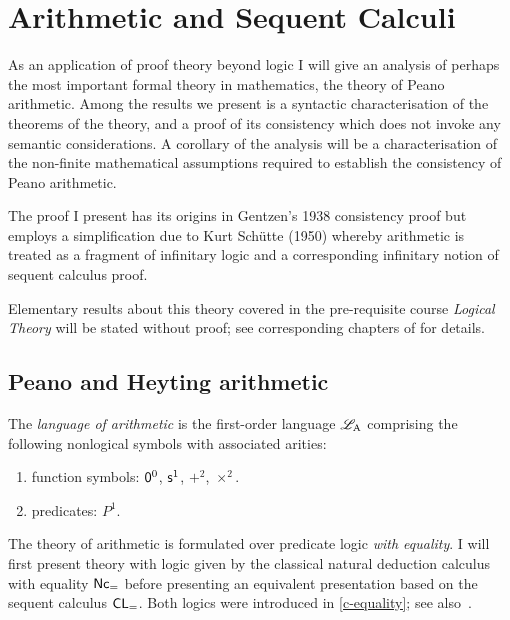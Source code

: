 %
\chapter{Arithmetic and Sequent Calculi}\label{c-oa-arith}
%
As an application of proof theory beyond logic I will give an analysis of perhaps the most important formal theory in mathematics, the theory of Peano arithmetic.
Among the results we present is a syntactic characterisation of the theorems of the theory, and a proof of its consistency which does not invoke any semantic considerations.
A corollary of the analysis will be a characterisation of the non-finite mathematical assumptions required to establish the consistency of Peano arithmetic.

The proof I present has its origins in Gentzen's 1938 consistency proof\nocite{Gen-1938} but employs a simplification due to Kurt Schütte (1950)\nocite{Schu1950} whereby arithmetic is treated as a fragment of infinitary logic and a corresponding infinitary notion of sequent calculus proof.

Elementary results about this theory covered in the pre-requisite course \emph{Logical Theory} will be stated without proof; see corresponding chapters of  for details.

\section{Peano and Heyting arithmetic}\label{s-oa-arithmetic}
%
\begin{definition}
	The \emph{language of arithmetic} is the first-order language \( \mathscr{L}_{\mathrm{A}} \) comprising the following nonlogical symbols with associated arities:
	\begin{enumerate}
		\item function symbols: \( \mathsf{0}^0 \), \( \mathsf{s}^1 \), \( +^2 \), \( ×^2 \).
		\item predicates: \( P^1 \).
	\end{enumerate}
\end{definition}
%
The theory of arithmetic is formulated over predicate logic \emph{with equality}. 
I will first present theory with logic given by the classical natural deduction calculus with equality \( \mathsf{Nc_=} \) before presenting an equivalent presentation based on the sequent calculus \( \mathsf{CL}_= \).
Both logics were introduced in \cref{c-equality}; see also~\cite[§6.5]{Negri_von_Plato}.

